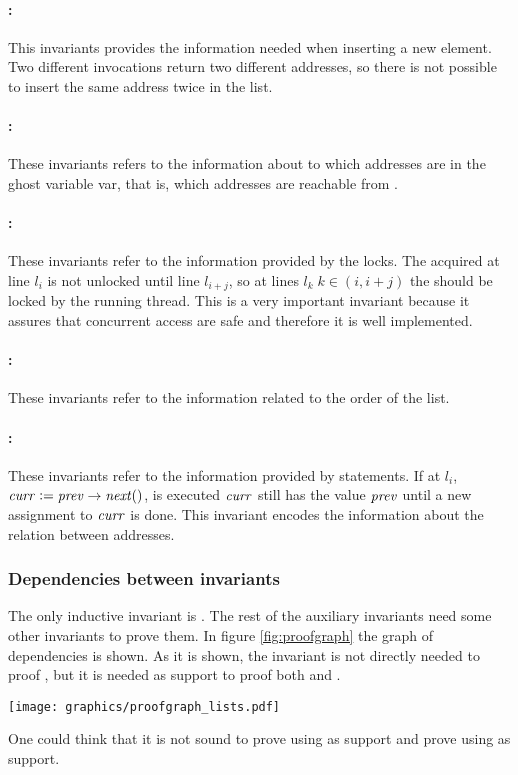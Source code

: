 \paragraph{\invDisjoint:}
This invariants provides the information needed when inserting a new element.
%
Two different \fMallocc invocations return two different addresses, so there is not possible to insert the same address twice in the list.
%
\paragraph{\invRegion:}
These invariants refers to the information about to which addresses are in the ghost variable \region var, that is, which addresses are reachable from \head.
%
\paragraph{\invLock:}
These invariants refer to the information provided by the locks. 
%
The \fLock acquired at line $l_i$ is not unlocked until line $l_{i+j}$, so at lines $l_{k}\; k\in(i,i+j)$ the \fLock should be locked by the running thread.
%
This is a very important invariant because it assures that concurrent access are safe and therefore it is well implemented.
%
\paragraph{\invOrder:}
These invariants refer to the information related to the order of the list. 
%
\paragraph{\invNext:}
These invariants refer to the information provided by \fNext statements. 
%
If at $l_i$, $\mathit{curr} := \mathit{prev}\to\mathit{next}()$, is executed $\mathit{curr}$ still has the value $\mathit{prev}$ until a new assignment to $\mathit{curr}$ is done.
%
This invariant encodes the information about the relation between addresses.

\subsubsection{Dependencies between invariants}
The only inductive invariant is \invOrder. 
%
The rest of the auxiliary invariants need some other invariants to prove them.
%
In figure \ref{fig:proofgraph} the graph of dependencies is shown.
%
As it is shown, the invariant \invDisjoint is not directly needed to proof \invPreserve, but it is needed as support to proof both \invNext and \invRegion. 

\begin{center}
\texttt{[image: graphics/proofgraph\_lists.pdf]}
\label{fig:proofgraph}
\end{center}

One could think that it is not sound to prove \invLock using \invRegion as support and prove \invRegion using \invLock as support.
%
